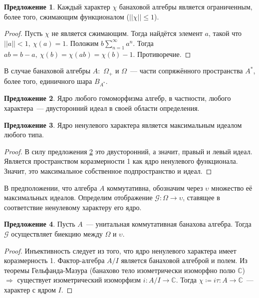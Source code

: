 \documentclass[12pt]{extarticle}
\theoremstyle{definition}
\newtheorem{suggestion}{\indent Предложение}[section]
\begin{document}
    \begin{suggestion}
    Каждый характер $\chi$ банаховой алгебры является ограниченным, более того, сжимающим функционалом ($||\chi|| \leq 1$).
    \end{suggestion}
    \begin{proof}
    Пусть $\chi$ не является сжимающим. Тогда найдётся элемент $a$, такой что $||a|| < 1,\ \chi(a) = 1$. Положим $b \sum \limits_{n=1}^{\infty}a^n$. Тогда $ab = b - a,\ \chi(b) = \chi(ab) = \chi(b) - 1$. Противоречие.
    \end{proof}
    В случае банаховой алгебры $A$:\ $\Omega_+$ и $\Omega$~--- части сопряжённого пространства $A^*$, более того, единичного шара $B_{A^*}$.
    \begin{suggestion}\label{sug:Ker is ideal}
        Ядро любого гомоморфизма алгебр, в частности, любого характера~--- двусторонний идеал в своей области определения.
    \end{suggestion}

    \begin{suggestion}
        Ядро ненулевого характера является максимальным идеалом любого типа.
    \end{suggestion}
    \begin{proof}
        В силу предложения \ref{sug:Ker is ideal} это двусторонний, а значит, правый и левый идеал. Является пространством коразмерности 1 как ядро ненулевого функционала. Значит, это максимальное собственное подпространство и идеал.
    \end{proof}
    В предположении, что алгебра $A$ коммутативна, обозначим через $\upsilon$ множество её максимальных идеалов. Определим отображение $\mathcal{G}: \Omega \rightarrow \upsilon$, ставящее в соответствие ненулевому характеру его ядро.
    \begin{suggestion}
        Пусть $A$~--- унитальная коммутативная банахова алгебра. Тогда $\mathcal{G}$ осуществляет биекцию между $\Omega$ и $\upsilon$.
    \end{suggestion}
    \begin{proof}
        Инъективность следует из того, что ядро ненулевого характера имеет коразмерность 1. Фактор-алгебра $A/I$ является банаховой алгеброй и полем. Из теоремы Гельфанда-Мазура (банахово тело изометрически изоморфно полю $\mathds{C}$) $\Rightarrow$ существует изометрический изоморфизм $i: A/I \rightarrow \mathds{C}$. Тогда $\chi \coloneq i\tau : A \rightarrow \mathds{C}$~--- характер с ядром $I$.
    \end{proof}
\end{document}
